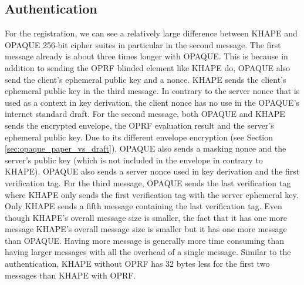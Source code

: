 ﻿\documentclass[../report.tex]{subfiles}
\begin{document}
\subsection*{Authentication}
For the registration, we can see a relatively large difference between KHAPE and OPAQUE 256-bit cipher suites in particular in the second message.
The first message already is about three times longer with OPAQUE. This is because in addition to sending the OPRF blinded element like KHAPE do, OPAQUE also send the client's ephemeral public key and a nonce. KHAPE sends the client's ephemeral public key in the third message.
In contrary to the server nonce that is used as a context in key derivation, the client nonce has no use in the OPAQUE's internet standard draft.
For the second message, both OPAQUE and KHAPE sends the encrypted envelope, the OPRF evaluation result and the server's ephemeral public key.
Due to its different envelope encryption (see Section \ref{sec:opaque_paper_vs_draft}), OPAQUE also sends a masking nonce and the server's public key (which is not included in the envelope in contrary to KHAPE).
OPAQUE also sends a server nonce used in key derivation and the first verification tag.
For the third message, OPAQUE sends the last verification tag where KHAPE only sends the first verification tag with the server ephemeral key.
Only KHAPE sends a fifth message containing the last verification tag.
Even though KHAPE's overall message size is smaller, the fact that it has one more message 
KHAPE's overall message size is smaller but it has one more message than OPAQUE. Having more message is generally more time consuming than having larger messages with all the overhead of a single message.
Similar to the authentication, KHAPE without OPRF has 32 bytes less for the first two messages than KHAPE with OPRF.


\end{document}
